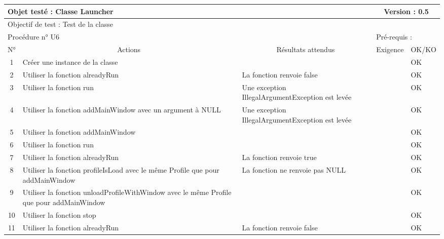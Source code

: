 \documentclass{../res/univ-projet}
\begin{document}
\begin{center}
	
    \begin{tabular}{|c|p{5cm}|p{5cm}|p{1.5cm}|p{1.5cm}|}
      \hline
      \multicolumn{3}{|l|}{Objet testé : Classe Launcher} & \multicolumn{2}{c|}{Version : 0.5}\\ \hline
      \multicolumn{5}{|l|}{Objectif de test : Test de la classe}\\ \hline
      \multicolumn{3}{|l|}{Procédure n° U6} & \multicolumn{2}{p{3cm}|}{Pré-requis : }\\ \hline
      \multicolumn{1}{|c|}{N°} & \multicolumn{1}{c|}{Actions} & \multicolumn{1}{c|}{Résultats attendus} & 
      \multicolumn{1}{c|}{Exigence} & \multicolumn{1}{c|}{OK/KO}\\ \hline
      1 & Créer une instance de la classe &  &  & OK \\
      2 & Utiliser la fonction alreadyRun & La fonction renvoie false &  & OK \\
      3 & Utiliser la fonction run & Une exception IllegalArgumentException est levée &  & OK \\
      4 & Utiliser la fonction addMainWindow avec un argument à NULL & Une exception IllegalArgumentException est levée &  & OK \\
      5 & Utiliser la fonction addMainWindow & &  & OK \\
	    6 & Utiliser la fonction run &  &  & OK \\
      7 & Utiliser la fonction alreadyRun & La fonction renvoie true &  & OK \\
      8 & Utiliser la fonction profileIsLoad avec le même Profile que pour addMainWindow & La fonction ne renvoie pas NULL &  & OK \\
      9 & Utiliser la fonction unloadProfileWithWindow avec le même Profile que pour addMainWindow &  &  & OK \\
      10 & Utiliser la fonction stop &  &  & OK \\
      11 & Utiliser la fonction alreadyRun & La fonction renvoie false &  & OK \\ 
	\hline
    \end{tabular}
    \vskip 2.2cm
	

\end{center}
\end{document}
